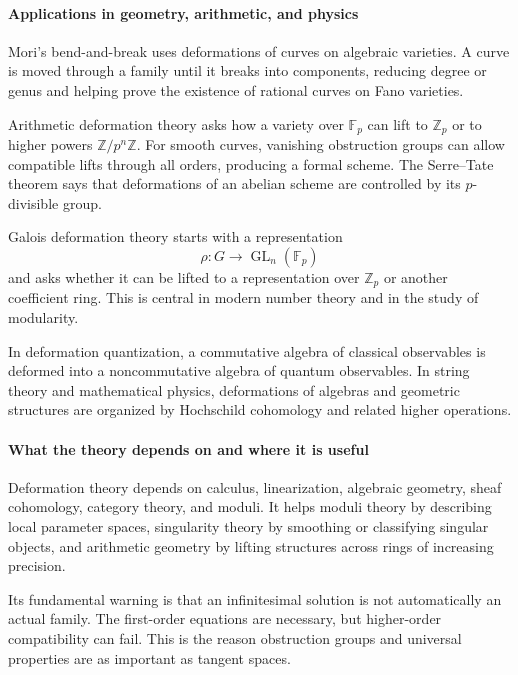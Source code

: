 \paragraph{Applications in geometry, arithmetic, and physics}

Mori's bend-and-break uses deformations of curves on algebraic varieties. A curve is moved through a family until it breaks into components, reducing degree or genus and helping prove the existence of rational curves on Fano varieties.

Arithmetic deformation theory asks how a variety over $\mathbb F_p$ can lift to $\mathbb Z_p$ or to higher powers $\mathbb Z/p^n\mathbb Z$. For smooth curves, vanishing obstruction groups can allow compatible lifts through all orders, producing a formal scheme. The Serre--Tate theorem says that deformations of an abelian scheme are controlled by its $p$-divisible group.

Galois deformation theory starts with a representation
\[
 \rho:G\longrightarrow\operatorname{GL}_n(\mathbb F_p)
\]
and asks whether it can be lifted to a representation over $\mathbb Z_p$ or another coefficient ring. This is central in modern number theory and in the study of modularity.

In deformation quantization, a commutative algebra of classical observables is deformed into a noncommutative algebra of quantum observables. In string theory and mathematical physics, deformations of algebras and geometric structures are organized by Hochschild cohomology and related higher operations. \cite{deformation_theory_ref6,deformation_theory_ref7}

\paragraph{What the theory depends on and where it is useful}

Deformation theory depends on calculus, linearization, algebraic geometry, sheaf cohomology, category theory, and moduli. It helps moduli theory by describing local parameter spaces, singularity theory by smoothing or classifying singular objects, and arithmetic geometry by lifting structures across rings of increasing precision.

Its fundamental warning is that an infinitesimal solution is not automatically an actual family. The first-order equations are necessary, but higher-order compatibility can fail. This is the reason obstruction groups and universal properties are as important as tangent spaces.

